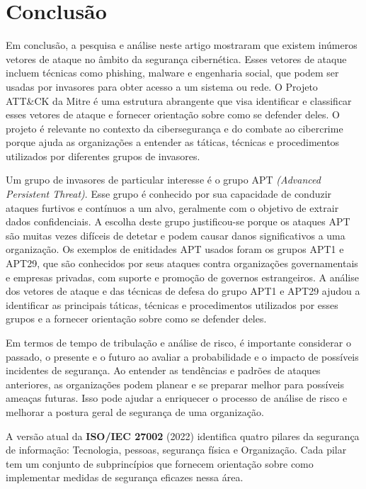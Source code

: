 \chapter{Conclusão}

Em conclusão, a pesquisa e análise neste artigo mostraram que existem inúmeros vetores de ataque no âmbito da segurança cibernética. Esses vetores de ataque incluem técnicas como phishing, malware e engenharia social, que podem ser usadas por invasores para obter acesso a um sistema ou rede. O Projeto ATT\&CK da Mitre é uma estrutura abrangente que visa identificar e classificar esses vetores de ataque e fornecer orientação sobre como se defender deles. O projeto é relevante no contexto da cibersegurança e do combate ao cibercrime porque ajuda as organizações a entender as táticas, técnicas e procedimentos utilizados por diferentes grupos de invasores.

Um grupo de invasores de particular interesse é o grupo APT \textit{(Advanced Persistent Threat)}. Esse grupo é conhecido por sua capacidade de conduzir ataques furtivos e contínuos a um alvo, geralmente com o objetivo de extrair dados confidenciais. A escolha deste grupo justificou-se porque os ataques APT são muitas vezes difíceis de detetar e podem causar danos significativos a uma organização. Os exemplos de enitidades APT usados foram os grupos APT1 e APT29, que são conhecidos por seus ataques contra organizações governamentais e empresas privadas, com suporte e promoção de governos estrangeiros. A análise dos vetores de ataque e das técnicas de defesa do grupo APT1 e APT29 ajudou a identificar as principais táticas, técnicas e procedimentos utilizados por esses grupos e a fornecer orientação sobre como se defender deles.

Em termos de tempo de tribulação e análise de risco, é importante considerar o passado, o presente e o futuro ao avaliar a probabilidade e o impacto de possíveis incidentes de segurança. Ao entender as tendências e padrões de ataques anteriores, as organizações podem planear e se preparar melhor para possíveis ameaças futuras. Isso pode ajudar a enriquecer o processo de análise de risco e melhorar a postura geral de segurança de uma organização.

A versão atual da \textbf{ISO/IEC 27002} (2022) identifica quatro pilares da segurança de informação: Tecnologia, pessoas, segurança física e Organização. Cada pilar tem um conjunto de subprincípios que fornecem orientação sobre como implementar medidas de segurança eficazes nessa área.


